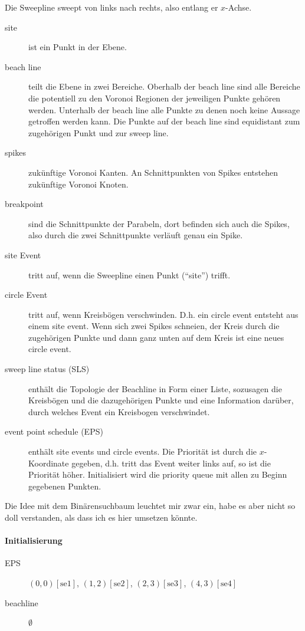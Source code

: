 Die Sweepline sweept von links nach rechts, also entlang er $x$-Achse.

\begin{description}
\item[site] ist ein Punkt in der Ebene.
\item[beach line] teilt die Ebene in zwei Bereiche. Oberhalb der beach line sind alle Bereiche die potentiell zu den Voronoi Regionen der jeweiligen Punkte gehören werden. Unterhalb der beach line alle Punkte zu denen noch keine Aussage getroffen werden kann. Die Punkte auf der beach line sind equidistant zum zugehörigen Punkt und zur sweep line.
\item[spikes] zukünftige Voronoi Kanten. An Schnittpunkten von Spikes entstehen zukünftige Voronoi Knoten.
\item[breakpoint] sind die Schnittpunkte der Parabeln, dort befinden sich auch die Spikes, also durch die zwei Schnittpunkte verläuft genau ein Spike.
\item[site Event] tritt auf, wenn die Sweepline einen Punkt ("`site"') trifft.
\item[circle Event] tritt auf, wenn Kreisbögen verschwinden. D.h. ein circle event entsteht aus einem site event. Wenn sich zwei Spikes schneien, der Kreis durch die zugehörigen Punkte und dann ganz unten auf dem Kreis ist eine neues circle event.
\item[sweep line status (SLS)] enthält die Topologie der Beachline in Form einer Liste, sozusagen die Kreisbögen und die dazugehörigen Punkte und eine Information darüber, durch welches Event ein Kreisbogen verschwindet.
\item[event point schedule (EPS)] enthält site events und circle events. Die Priorität ist durch die $x$-Koordinate gegeben, d.h. tritt das Event weiter links auf, so ist die Priorität höher. Initialisiert wird die priority queue mit allen zu Beginn gegebenen Punkten.
\end{description}

Die Idee mit dem Binärensuchbaum leuchtet mir zwar ein, habe es aber nicht so doll verstanden, als dass ich es hier umsetzen könnte.


\paragraph*{Initialisierung}
\begin{description}
\item[EPS] $(0,0)[\text{se1}]$, $(1,2)[\text{se2}]$, $(2,3)[\text{se3}]$, $(4,3)[\text{se4}]$
\item[beachline] $\emptyset$
\end{description}

